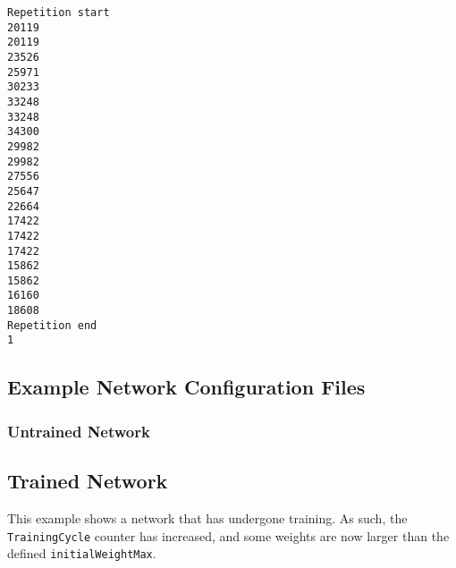 \documentclass[a4paper]{article}
\begin{document}
\begin{lstlisting}
Repetition start
20119
20119
23526
25971
30233
33248
33248
34300
29982
29982
27556
25647
22664
17422
17422
17422
15862
15862
16160
18608
Repetition end
1
\end{lstlisting}

\subsection{Example Network Configuration Files}%

\subsubsection{Untrained Network}


\subsection{Trained Network}

This example shows a network that has undergone training. As such, the \lstinline{TrainingCycle} counter has increased, and some weights are now larger than the defined \lstinline{initialWeightMax}.
\end{document}
